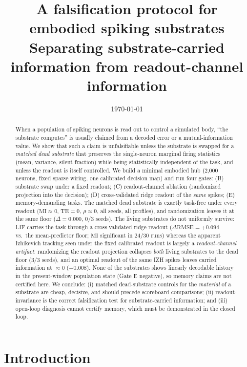 \documentclass[10pt,a4paper]{article}
\title{\vspace{-1.5em}A falsification protocol for embodied spiking
substrates\\[0.3em]
{\large Separating substrate-carried information from readout-channel
information}\vspace{-0.5em}}
\author{}
\date{\today}
\newcommand{\RMSE}{\ensuremath{\mathrm{RMSE}}}
\newcommand{\MI}{\ensuremath{\mathrm{MI}}}
\newcommand{\TE}{\ensuremath{\mathrm{TE}}}
\begin{document}
\maketitle
\vspace{-3em}

\begin{abstract}
\noindent
When a population of spiking neurons is read out to control a simulated
body, ``the substrate computes'' is usually claimed from a decoded
error or a mutual-information value. We show that such a claim is
unfalsifiable unless the substrate is swapped for a \emph{matched dead
substrate} that preserves the single-neuron marginal firing statistics
(mean, variance, silent fraction) while being statistically independent
of the task, and unless the readout is itself controlled. We build a
minimal embodied hub (2{,}000 neurons, fixed sparse wiring, one
calibrated decision map) and run four gates: (B) substrate swap under a
fixed readout; (C) readout-channel ablation (randomized projection into
the decision); (D) cross-validated ridge readout of the \emph{same}
spikes; (E) memory-demanding tasks. The matched dead substrate is
exactly task-free under every readout ($\MI\approx0$, $\TE=0$,
$\rho\approx0$, all seeds, all profiles), and randomization leaves it
at the same floor ($\Delta=0.000$, $0/3$ seeds). The living substrates
do not uniformly survive: LIF carries the task through a
cross-validated ridge readout ($\Delta\RMSE=+0.094$ vs.\ the
mean-predictor floor; $\MI$ significant in $24/30$ runs) whereas the
apparent Izhikevich tracking seen under the fixed calibrated readout is
largely a \emph{readout-channel artifact}: randomizing the readout
projection collapses \emph{both} living substrates to the dead floor
($3/3$ seeds), and an optimal readout of the same IZH spikes leaves
carried information at $\approx0$ ($-0.008$). None of the substrates
shows linearly decodable history in the present-window population state
(Gate E negative), so memory claims are not certified here. We
conclude: (i) matched dead-substrate controls for the \emph{material}
of a substrate are cheap, decisive, and should precede scoreboard
comparisons; (ii) readout-invariance is the correct falsification test
for substrate-carried information; and (iii) open-loop diagnosis cannot
certify memory, which must be demonstrated in the closed loop.
\end{abstract}

\section{Introduction}\label{sec:intro}
\end{document}
